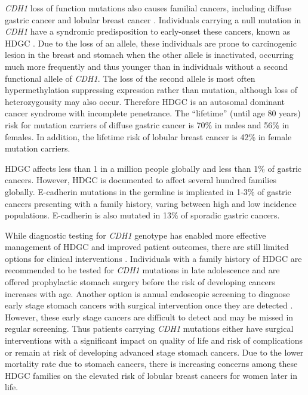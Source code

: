 \textit{CDH1} loss of function mutations also causes familial cancers, including diffuse gastric cancer and lobular breast cancer \citep{HDGC,Graziano2003,Guilford2010,Oliveira2009}. Individuals carrying a null mutation in \textit{CDH1} have a syndromic predisposition to early-onset these cancers, known as \gls{HDGC} \citep{Guilford1998}. Due to the loss of an allele, these individuals are prone to carcinogenic lesion in the breast and stomach when the other allele is inactivated, occurring much more frequently and thus younger than in individuals without a second functional allele of \textit{CDH1}. The loss of the second allele is most often hypermethylation suppressing expression rather than mutation, although loss of heterozygousity may also occur. Therefore \gls{HDGC} is an autosomal dominant cancer syndrome with incomplete penetrance. The ``lifetime'' (until age 80 years) risk for mutation carriers  of diffuse gastric cancer is 70\% in males and 56\% in females. In addition, the lifetime risk of lobular breast cancer is 42\% in female mutation carriers.   

\gls{HDGC} affects less than 1 in a million people globally \citep{Ferlay2015} and less than 1\% of gastric cancers. However, \gls{HDGC} is documented to affect several hundred families globally. \gls{E-cadherin} mutations in the germline is implicated in 1-3\% of gastric cancers presenting with a family history, varing between high and low incidence populations. \gls{E-cadherin} is also mutated in 13\% of sporadic gastric cancers.

While diagnostic testing for \textit{CDH1} genotype has enabled more effective management of \gls{HDGC} and improved patient outcomes, there are still limited options for clinical interventions \citep{Guilford2010}. Individuals with a family history of \gls{HDGC} are recommended to be tested for \textit{CDH1} mutations in late adolescence and are offered prophylactic stomach surgery before the risk of developing cancers increases with age. Another option is annual endoscopic screening to diagnose early stage stomach cancers with surgical intervention once they are detected \citep{Oliveira2013}. However, these early stage cancers are difficult to detect and may be missed in regular screening. Thus patients carrying \textit{CDH1} mutations either have surgical interventions with a significant impact on quality of life and risk of complications or remain at risk of developing advanced stage stomach cancers. Due to the lower mortality rate due to stomach cancers, there is increasing concerns among these \gls{HDGC} families on the elevated risk of lobular breast cancers for women later in life.

